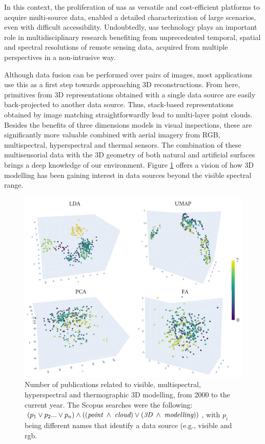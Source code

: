 In this context, the proliferation of \acrshort{uas} as versatile and cost-efficient platforms to acquire multi-source data, enabled a detailed characterization of large scenarios, even with difficult accessibility. Undoubtedly, \acrshort{uas} technology plays an important role in multidisciplinary research benefiting from unprecedented temporal, spatial and spectral resolutions of remote sensing data, acquired from multiple perspectives in a non-intrusive way.

Although data fusion can be performed over pairs of images, most applications use this as a first step towards approaching 3D reconstructions. From here, primitives from 3D representations obtained with a single data source are easily back-projected to another data source. Thus, stack-based representations obtained by image matching straightforwardly lead to multi-layer point clouds. Besides the benefits of three dimensions models in visual inspections, these are significantly more valuable combined with aerial imagery from RGB, multispectral, hyperspectral and thermal sensors. The combination of these multisensorial data with the 3D geometry of both natural and artificial surfaces brings a deep knowledge of our environment. Figure \ref{fig:scopus_point_clouds} offers a vision of how 3D modelling has been gaining interest in data sources beyond the visible spectral range.

\begin{figure}[ht]
    \centering
    \includegraphics[width=\linewidth]{figs/vineyard_classification/feature_reduction.png}
	\caption{Number of publications related to visible, multispectral, hyperspectral and thermographic 3D modelling, from 2000 to the current year. The Scopus searches were the following: $(p_1 \lor p_2 ... \lor p_n) \land ((\textit{point} \hspace{1mm} \land \hspace{1mm} \textit{cloud}) \lor (\textit{3D} \hspace{1mm} \land \hspace{1mm} \textit{modelling}))$, with $p_i$ being different names that identify a data source (e.g., visible and \acrshort{rgb}. }
	\label{fig:scopus_point_clouds}
\end{figure}

